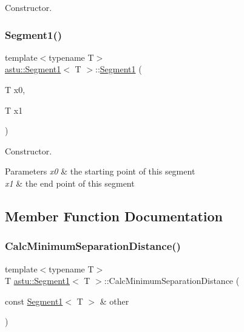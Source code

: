 Constructor. \mbox{\label{classastu_1_1Segment1_a0a1a68b25f64a088e83abb73511c887b}} 
\subsubsection{\texorpdfstring{Segment1()}{Segment1()}\hspace{0.1cm}{\footnotesize\ttfamily [2/2]}}
{\footnotesize\ttfamily template$<$typename T$>$ \\
\hyperlink{classastu_1_1Segment1}{astu\+::\+Segment1}$<$ T $>$\+::\hyperlink{classastu_1_1Segment1}{Segment1} (\begin{DoxyParamCaption}\item[{T}]{x0,  }\item[{T}]{x1 }\end{DoxyParamCaption})\hspace{0.3cm}{\ttfamily [inline]}}

Constructor.


\begin{DoxyParams}{Parameters}
{\em x0} & the starting point of this segment \\
\hline
{\em x1} & the end point of this segment \\
\hline
\end{DoxyParams}


\subsection{Member Function Documentation}
\mbox{\label{classastu_1_1Segment1_a13e7485b944e90e4ce4767710a5d97cd}} 
\subsubsection{\texorpdfstring{Calc\+Minimum\+Separation\+Distance()}{CalcMinimumSeparationDistance()}}
{\footnotesize\ttfamily template$<$typename T$>$ \\
T \hyperlink{classastu_1_1Segment1}{astu\+::\+Segment1}$<$ T $>$\+::Calc\+Minimum\+Separation\+Distance (\begin{DoxyParamCaption}\item[{const \hyperlink{classastu_1_1Segment1}{Segment1}$<$ T $>$ \&}]{other }\end{DoxyParamCaption})\hspace{0.3cm}{\ttfamily [inline]}}

